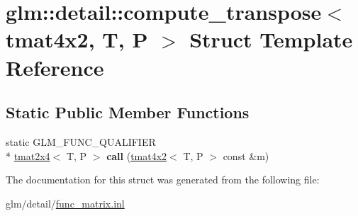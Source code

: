 \hypertarget{structglm_1_1detail_1_1compute__transpose_3_01tmat4x2_00_01T_00_01P_01_4}{\section{glm\-:\-:detail\-:\-:compute\-\_\-transpose$<$ tmat4x2, T, P $>$ Struct Template Reference}
\label{structglm_1_1detail_1_1compute__transpose_3_01tmat4x2_00_01T_00_01P_01_4}
}
\subsection*{Static Public Member Functions}
\begin{DoxyCompactItemize}
\item 
\hypertarget{structglm_1_1detail_1_1compute__transpose_3_01tmat4x2_00_01T_00_01P_01_4_a7c4f8fb4ae6caf6fc6794667b1e7ba0c}{static G\-L\-M\-\_\-\-F\-U\-N\-C\-\_\-\-Q\-U\-A\-L\-I\-F\-I\-E\-R \\*
\hyperlink{structglm_1_1tmat2x4}{tmat2x4}$<$ T, P $>$ {\bfseries call} (\hyperlink{structglm_1_1tmat4x2}{tmat4x2}$<$ T, P $>$ const \&m)}\label{structglm_1_1detail_1_1compute__transpose_3_01tmat4x2_00_01T_00_01P_01_4_a7c4f8fb4ae6caf6fc6794667b1e7ba0c}

\end{DoxyCompactItemize}


The documentation for this struct was generated from the following file\-:\begin{DoxyCompactItemize}
\item 
glm/detail/\hyperlink{func__matrix_8inl}{func\-\_\-matrix.\-inl}\end{DoxyCompactItemize}
